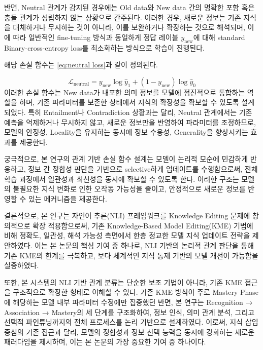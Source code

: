 \documentclass[a4paper,fleqn]{cas-sc}
\begin{document}
반면, Neutral 관계가 감지된 경우에는 Old data와 New data 간의 명확한 포함 혹은 충돌 관계가 성립하지 않는 상황으로 간주된다. 이러한 경우, 새로운 정보는 기존 지식을 대체하거나 무시하는 것이 아니라, 이를 보완하거나 확장하는 것으로 해석되며, 이에 따라 일반적인 fine-tuning 방식과 동일하게 정답 레이블 \( y_{\text{new}} \)​에 대해 standard Binary-cross-entropy loss를 최소화하는 방식으로 학습이 진행된다.

해당 손실 함수는 \cref{eq:neutral loss}과 같이 정의된다.

\begin{equation}
    \mathcal{L}_{\text{neutral}} = {y_{\text{new}} \log \hat{y}_1 + (1 - y_{\text{new}}) \log \hat{y}_0}
    \label{eq:neutral loss}
\end{equation}
이러한 손실 함수는 New data가 내포한 의미 정보를 모델에 점진적으로 통합하는 역할을 하며, 기존 파라미터를 보존한 상태에서 지식의 확장성을 확보할 수 있도록 설계되었다. 특히 Entailment나 Contradiction 상황과는 달리, Neutral 관계에서는 기존 예측을 억제하거나 무시하지 않고, 새로운 정보만을 반영하여 파라미터를 조정하므로, 모델의 안정성, Locality을 유지하는 동시에 정보 수용성, Generality을 향상시키는 효과를 제공한다.

궁극적으로, 본 연구의 관계 기반 손실 함수 설계는 모델이 논리적 모순에 민감하게 반응하고, 정보 간 정합성 판단을 기반으로 selective하게 업데이트를 수행함으로써, 전체 학습 과정에서 일관성과 최신성을 동시에 확보할 수 있도록 한다. 이러한 구조는 모델의 불필요한 지식 변화로 인한 오작동 가능성을 줄이고, 안정적으로 새로운 정보를 반영할 수 있는 메커니즘을 제공한다.

결론적으로, 본 연구는 자연어 추론(NLI) 프레임워크를 Knowledge Editing 문제에 창의적으로 확장 적용함으로써, 기존 Knowledge-Based Model Editing(KME) 기법에 비해 정확도, 일관성, 해석 가능성 측면에서 한층 정교한 모델 지식 업데이트 전략을 제안하였다. 이는 본 논문의 핵심 기여 중 하나로, NLI 기반의 논리적 관계 판단을 통해 기존 KME의 한계를 극복하고, 보다 체계적인 지식 통제 기반의 모델 개선이 가능함을 실증하였다.

또한, 본 시스템의 NLI 기반 관계 분류는 단순한 보조 기법이 아니라, 기존 KME 접근을 구조적으로 확장한 형태로 이해할 수 있다. 기존 KME 방식이 주로 Mastery Phase에 해당하는 모델 내부 파라미터 수정에만 집중했던 반면, 본 연구는 Recognition → Association → Mastery의 세 단계를 구조화하여, 정보 인식, 의미 관계 분석, 그리고 선택적 파인튜닝까지의 전체 프로세스를 논리 기반으로 설계하였다. 이로써, 지식 삽입 중심의 기존 접근과 달리, 모델의 정합성과 정보 선택 능력을 동시에 강화하는 새로운 패러다임을 제시하며, 이는 본 논문의 가장 중요한 기여 중 하나이다.
\end{document}
